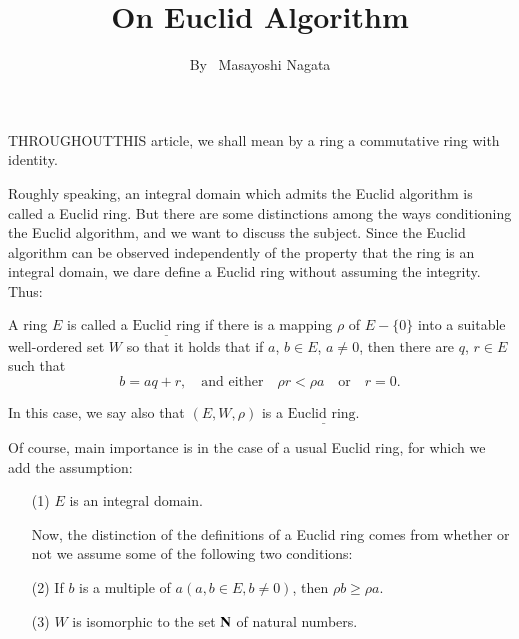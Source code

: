 \title{On Euclid Algorithm}\label{art16}

\author{By~ Masayoshi Nagata}

\date{}
\maketitle

\setcounter{page}{209}
\setcounter{pageoriginal}{174}
THROUGHOUT\pageoriginale THIS article, we shall mean by a ring a commutative ring with identity.

Roughly speaking, an integral domain which admits the Euclid algorithm is called a Euclid ring. But there are some distinctions among the ways conditioning  the Euclid algorithm, and we want to discuss the subject. Since the Euclid algorithm can be observed independently of the property that the ring is an integral domain, we dare define a Euclid ring without assuming the integrity. Thus:

\begin{defi*}
  A ring $E$ is called a $\underline{\text{Euclid ring}}$ if there is a mapping $\rho$ of $E-\{0\}$ into a suitable well-ordered set $W$ so that it holds that if $a$, $b \in E$, $a \neq 0$, then there are $q$, $r \in E$ such that 
\begin{equation*}
b = aq +r , \text{~~ and either ~~} \rho r < \rho a \text{~~ or ~~} r = 0. \tag{*}
\end{equation*}

In this case, we say also that $(E, W, \rho)$ is a $\underline{\text{Euclid ring.}}$
\end{defi*}

Of course, main importance is in the case of a usual Euclid ring, for which we add the assumption:
\begin{itemize}
\item[\rm (1)] $E$ is an integral domain.

Now, the distinction of the definitions of a Euclid ring comes from whether or not we assume some of the following two conditions:

\item[\rm (2)] If $b$ is a multiple of $a (a,b \in E, b \neq 0)$, then $\rho b\geqslant \rho a$.

\item[\rm (3)] $W$ is isomorphic to the set $\mathbf{N}$ of natural numbers. 
\end{itemize}

